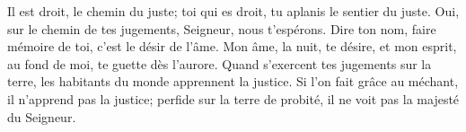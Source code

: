 Il est droit, le chemin du juste;
	toi qui es droit, tu aplanis le sentier du juste.
Oui, sur le chemin de tes jugements, Seigneur, nous t’espérons.
	Dire ton nom, faire mémoire de toi, c’est le désir de l’âme.
Mon âme, la nuit, te désire,
	et mon esprit, au fond de moi, te guette dès l’aurore.
Quand s’exercent tes jugements sur la terre,
	les habitants du monde apprennent la justice.
Si l’on fait grâce au méchant, il n’apprend pas la justice;
	perfide sur la terre de probité,
	il ne voit pas la majesté du Seigneur.
